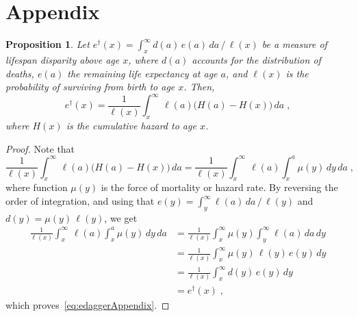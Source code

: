 \documentclass[a4paper,twoside, openright, 12pt, leqno]{article}
\newtheorem{theorem}{Proposition}
\begin{document}
% 



\newpage
\linespread{1}\normalsize






\newpage

\section*{Appendix}

\setcounter{equation}{0}
\renewcommand{\theequation}{A\arabic{equation}}

\begin{theorem}
 Let $e^\dagger(x)=\int_x^\infty d(a)\,e(a)\,da\,/\,\ell(x)$ be a measure of lifespan disparity above age $x$, where $d(a)$ accounts for the distribution of deaths, $e(a)$ the remaining life expectancy at age $a$, and $\ell(x)$ is the probability of surviving from birth to age $x$. Then,
 \begin{equation}
  e^\dagger(x)=\frac{1}{\ell(x)}\int_x^\infty\,\ell(a)\big(H(a)-H(x)\big)\,da\;,
  \label{eq:edaggerAppendix}
 \end{equation}
 where $H(x)$ is the cumulative hazard to age $x$.
 \label{prop1}
\end{theorem}

\begin{proof}
  Note that
  $$
  \frac{1}{\ell(x)}\int_x^\infty\,\ell(a)\big(H(a)-H(x)\big)\,da=\frac{1}{\ell(x)}\int_x^\infty\,\ell(a)\int_x^a\mu(y)\,dy\,da\;,
  $$
  where function $\mu(y)$ is the force of mortality or hazard rate. By reversing the order of integration, and using that $e(y)=\int_y^\infty\ell(a)\,da\,/\,\ell(y)$ and $d(y)=\mu(y)\,\ell(y)$, we get
  \begin{equation*}
    \begin{split}
      \frac{1}{\ell(x)}\int_x^\infty\,\ell(a)\int_x^a\mu(y)\,dy\,da
	  & = \frac{1}{\ell(x)}\int_x^\infty\mu(y)\int_y^\infty\ell(a)\,da\,dy			\\
	  & = \frac{1}{\ell(x)}\int_x^\infty\mu(y)\,\ell(y)\,e(y)\,dy				\\			
	  & = \frac{1}{\ell(x)}\int_x^\infty d(y)\,e(y)\,dy				\\
	  & = e^\dagger(x)\;,
    \end{split}  
  \end{equation*}
  which proves~\eqref{eq:edaggerAppendix}.
\end{proof}
\medskip
\end{document}
